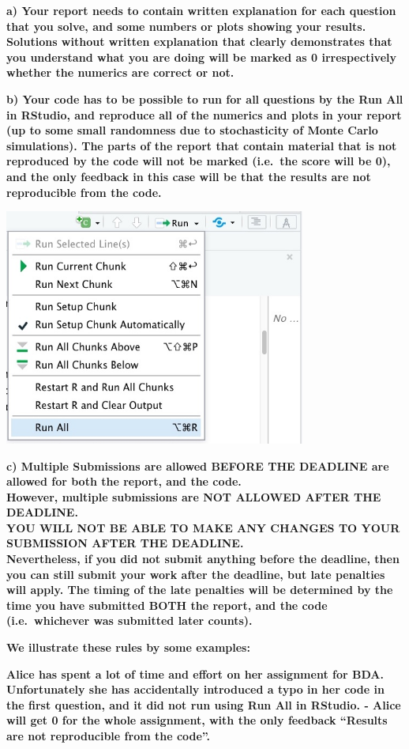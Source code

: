 \documentclass[
]{article}
\begin{document}
\textbf{a) Your report needs to contain written explanation for each
question that you solve, and some numbers or plots showing your results.
Solutions without written explanation that clearly demonstrates that you
understand what you are doing will be marked as 0 irrespectively whether
the numerics are correct or not.}

\textbf{b) Your code has to be possible to run for all questions by the
Run All in RStudio, and reproduce all of the numerics and plots in your
report (up to some small randomness due to stochasticity of Monte Carlo
simulations). The parts of the report that contain material that is not
reproduced by the code will not be marked (i.e.~the score will be 0),
and the only feedback in this case will be that the results are not
reproducible from the code.}

\includegraphics[width=3.90625in,height=\textheight]{run_all.jpg}

\textbf{c) Multiple Submissions are allowed BEFORE THE DEADLINE are
allowed for both the report, and the code.\\
However, multiple submissions are NOT ALLOWED AFTER THE DEADLINE.\\
YOU WILL NOT BE ABLE TO MAKE ANY CHANGES TO YOUR SUBMISSION AFTER THE
DEADLINE.\\
Nevertheless, if you did not submit anything before the deadline, then
you can still submit your work after the deadline, but late penalties
will apply. The timing of the late penalties will be determined by the
time you have submitted BOTH the report, and the code (i.e.~whichever
was submitted later counts).}

\textbf{We illustrate these rules by some examples:}

\textbf{Alice has spent a lot of time and effort on her assignment for
BDA. Unfortunately she has accidentally introduced a typo in her code in
the first question, and it did not run using Run All in RStudio. - Alice
will get 0 for the whole assignment, with the only feedback ``Results
are not reproducible from the code''.}
\end{document}
